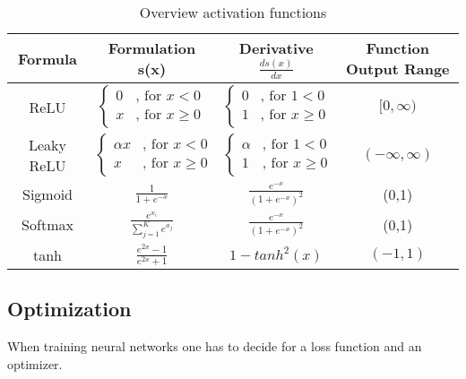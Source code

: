 \begin {table}[H]
\begin{tabular}{ c c c c }
\toprule 
Formula & Formulation s(x) & Derivative $\frac{ds(x)}{dx}$ & Function Output Range \\
\midrule 
ReLU &   $\begin{cases} 0 & \text{, for }x < 0\\
	x & \text{, for }x \geqslant 0 \end{cases}$ & $\begin{cases} 0 & \text{, for }1 < 0\\
	1 & \text{, for }x \geqslant 0 \end{cases}$ & $[ 0, \infty)$\\

\rule{0pt}{5ex}%

Leaky ReLU &   $\begin{cases} \alpha x & \text{, for }x < 0\\
	x & \text{, for }x \geqslant 0 \end{cases}$ & $\begin{cases} \alpha & \text{, for }1 < 0\\
	1 & \text{, for }x \geqslant 0 \end{cases}$ & $(- \infty, \infty)$\\

\rule{0pt}{5ex}%

Sigmoid & $\frac{1}{1+e^{-x}}$ & $\frac{e^{-x}}{(1+e^{-x})^{2}}$ & (0,1)\\

\rule{0pt}{5ex}%

Softmax & $\frac{e^{x_{i}}}{\sum_{j=1}^{K} e^{x_{j}}}$ & $\frac{e^{-x}}{(1+e^{-x})^{2}}$ & (0,1)\\

\rule{0pt}{5ex}%

tanh & $\frac{e^{2x}-1}{e^{2x}+1}$ & $1-tanh^{2}(x)$ & $(-1,1)$ \\
\bottomrule  

\end{tabular}
\caption {Overview activation functions \cite{Ding2018}} \label{tab:activation_functions}
\end {table}
\subsection{Optimization}
When training neural networks one has to decide for a loss function and an optimizer. 

